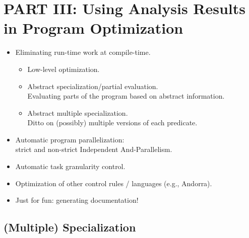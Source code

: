 \documentclass{article}
\renewcommand{\_}{\char'137}
\begin{document}
\newpage
\section{PART III: Using Analysis Results in Program Optimization}

\begin{itemize}
\item Eliminating run-time work at compile-time.
  \begin{itemize}
  \item Low-level optimization.
  \item Abstract specialization/partial evaluation.\\
        Evaluating parts of the program based on abstract information.
  \item Abstract multiple specialization.\\
        Ditto on (possibly) multiple versions of each predicate.
  \end{itemize}
\item Automatic program parallelization: \\
      strict and non-strict Independent And-Parallelism.
\item Automatic task granularity control.
\item Optimization of other control rules / languages (e.g., Andorra).
\item Just for fun: generating documentation!
\end{itemize}

\subsection{(Multiple) Specialization}
\end{document}
